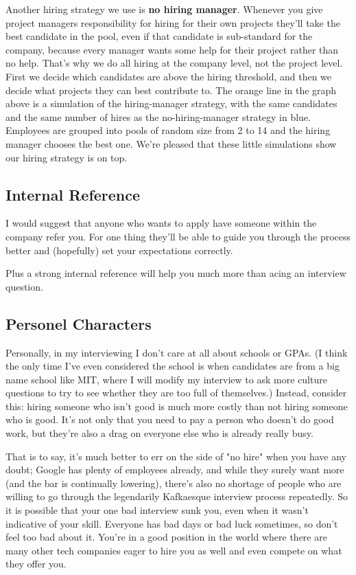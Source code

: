 \documentclass[12pt, reqno, oneside]{amsart}
\begin{document}
Another hiring strategy we use is \textbf{no hiring manager}. Whenever you give project managers responsibility for hiring for their own projects they'll take the best candidate in the pool, even if that candidate is sub-standard for the company, because every manager wants some help for their project rather than no help. That's why we do all hiring at the company level, not the project level. First we decide which candidates are above the hiring threshold, and then we decide what projects they can best contribute to. The orange line in the graph above is a simulation of the hiring-manager strategy, with the same candidates and the same number of hires as the no-hiring-manager strategy in blue. Employees are grouped into pools of random size from 2 to 14 and the hiring manager chooses the best one. We're pleased that these little simulations show our hiring strategy is on top. 


\subsection{Internal Reference}

I would suggest that anyone who wants to apply have someone within the company refer you. For one thing they'll be able to guide you through the process better and (hopefully) set your expectations correctly.

Plus a strong internal reference will help you much more than acing an interview question.

\subsection{Personel Characters}
Personally, in my interviewing I don't care at all about schools or GPAs. (I think the only time I've even considered the school is when candidates are from a big name school like MIT, where I will modify my interview to ask more culture questions to try to see whether they are too full of themselves.)
Instead, consider this: hiring someone who isn't good is much more costly than not hiring someone who is good. It's not only that you need to pay a person who doesn't do good work, but they're also a drag on everyone else who is already really busy.

That is to say, it's much better to err on the side of "no hire" when you have any doubt; Google has plenty of employees already, and while they surely want more (and the bar is continually lowering), there's also no shortage of people who are willing to go through the legendarily Kafkaesque interview process repeatedly.
So it is possible that your one bad interview sunk you, even when it wasn't indicative of your skill. Everyone has bad days or bad luck sometimes, so don't feel too bad about it. You're in a good position in the world where there are many other tech companies eager to hire you as well and even compete on what they offer you.
\end{document}
